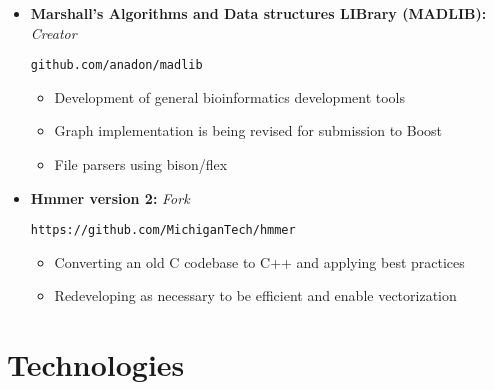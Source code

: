 \documentclass[10pt,a4paper,sans]{moderncv}        %
\begin{document}
\begin{itemize}

\item{\textbf{Marshall's Algorithms and Data structures LIBrary (MADLIB):} \textit{Creator}

\vspace{3pt}

\small{
\texttt{github.com/anadon/madlib}
\begin{itemize}
\item Development of general bioinformatics development tools
\item Graph implementation is being revised for submission to Boost
\item File parsers using bison/flex
\end{itemize}
}}

\vspace{6pt}

\item{\textbf{Hmmer version 2:} \textit{Fork}

\vspace{3pt}

\small{
\texttt{https://github.com/MichiganTech/hmmer}
\begin{itemize}
\item Converting an old C codebase to C++ and applying best practices
\item Redeveloping as necessary to be efficient and enable vectorization
\end{itemize}
}}

\end{itemize}

\vspace{2pt}

%
%
%
%


\section{Technologies}
\end{document}
